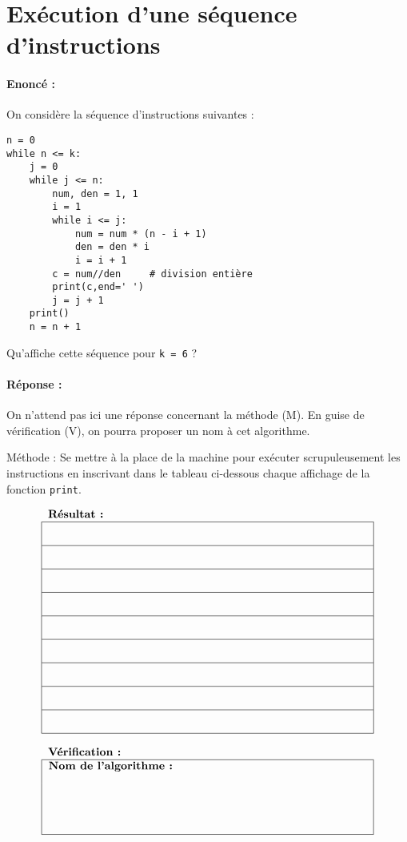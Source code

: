 \documentclass[11pt,a4paper,colorlinks,breaklinks]{article}
\begin{document}
\newpage
{}
\section{Exécution d'une séquence d'instructions}

\paragraph{Enoncé :}
On considère la séquence d'instructions suivantes :

\begin{lstlisting}
n = 0
while n <= k:
    j = 0
    while j <= n:
        num, den = 1, 1
        i = 1
        while i <= j:
            num = num * (n - i + 1)
            den = den * i
            i = i + 1
        c = num//den     # division entière
        print(c,end=' ')
        j = j + 1
    print()
    n = n + 1
\end{lstlisting}
\vspace*{3mm}

\noindent Qu'affiche cette séquence pour \texttt{k = 6} ?

\paragraph{Réponse :} On n'attend pas ici une réponse concernant la méthode (M).
En guise de vérification (V), on pourra proposer un nom à cet algorithme.

\noindent Méthode : Se mettre à la place de la
machine pour exécuter scrupuleusement les instructions en inscrivant dans
le tableau ci-dessous chaque affichage de la fonction \texttt{print}.

$$\begin{tabular}{|l|}
\multicolumn{1}{l}{\textbf{Résultat :}}\\
\hline
\makebox[10cm]{}\\[3mm]
\hline
\mbox{}\\[3mm]
\hline
\mbox{}\\[3mm]
\hline
\mbox{}\\[3mm]
\hline
\mbox{}\\[3mm]
\hline
\mbox{}\\[3mm]
\hline
\mbox{}\\[3mm]
\hline
\mbox{}\\[3mm]
\hline
\mbox{}\\[3mm]
\hline
\end{tabular}$$

$$\begin{tabular}{|l|}
\multicolumn{1}{l}{\textbf{Vérification :}}\\
\hline
\makebox[10cm][l]{\bf Nom de l'algorithme :}\\[3mm]
\mbox{}\\[12mm]
\hline
\end{tabular}$$

\end{document}
